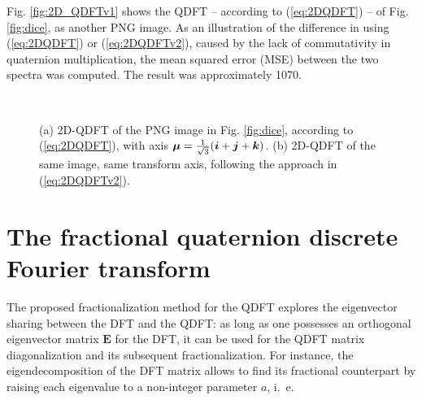 Fig. \ref{fig:2D_QDFTv1} shows the QDFT -- according to (\ref{eq:2DQDFT}) -- of Fig. \ref{fig:dice}, as another PNG image. As an illustration of the difference in using (\ref{eq:2DQDFT}) or (\ref{eq:2DQDFTv2}), caused by the lack of commutativity in quaternion multiplication, the mean squared error (MSE) between the two spectra was computed. The result was approximately 1070.

\begin{figure}
\centering
\caption{(a) 2D-QDFT of the PNG image in Fig. \ref{fig:dice}, according to (\ref{eq:2DQDFT}), with axis $ \boldsymbol{\mu} = \frac{1}{\sqrt{3}}(\boldsymbol{i} + \boldsymbol{j} + \boldsymbol{k}) $. (b) 2D-QDFT of the same image, same transform axis, following the approach in (\ref{eq:2DQDFTv2}).}
~
\floatsource
\label{fig:QDFT}
\end{figure}

\section{The fractional quaternion discrete Fourier transform}
\label{sec:FrQDFT}
The proposed fractionalization method for the QDFT explores the eigenvector sharing between the DFT and the QDFT: as long as one possesses an orthogonal eigenvector matrix $ \mathbf{E} $ for the DFT, it can be used for the QDFT matrix diagonalization and its subsequent fractionalization. For instance, the eigendecomposition of the DFT matrix allows to find its fractional counterpart by raising each eigenvalue to a non-integer parameter $ a $, i.~e.

